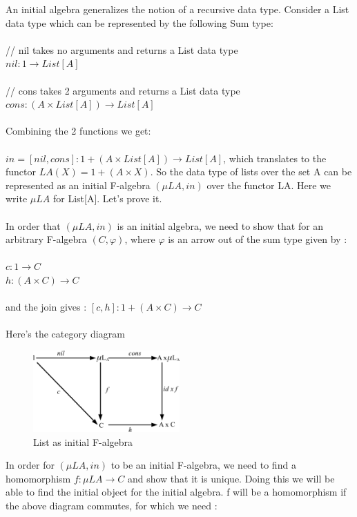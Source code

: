 \documentclass{article}
\begin{document}
An initial algebra generalizes the notion of a recursive data type. Consider a List data type which can be represented by the following Sum type: \\ \\
// nil takes no arguments and returns a List data type \\
$nil: 1 \rightarrow List[A]$ \\ \\
// cons takes 2 arguments and returns a List data type \\
$cons: (A \times List[A]) \rightarrow List[A]$ \\ \\
Combining the 2 functions we get: \\ \\
$in = [nil, cons]: 1 + (A \times List[A]) \rightarrow List[A]$, which translates to the functor $LA(X) = 1 + (A \times X)$. So the data type of lists over the set A can be represented as an initial F-algebra $(\mu LA, in)$ over the functor LA. Here we write $\mu LA$ for List[A]. Let's prove it. \\ \\
In order that $(\mu LA, in)$ is an initial algebra, we need to show that for an arbitrary F-algebra $(C, \varphi)$, where $\varphi$ is an arrow out of the sum type given by : \\ \\
$c: 1 \rightarrow C$ \\
$h: (A \times C) \rightarrow C$ \\ \\
and the join gives :
$[c, h]: 1 + (A \times C) \rightarrow C$ \\ \\
Here's the category diagram
\begin{figure}[htb]
\begin{center}
\includegraphics[width=0.5\textwidth]{figures/alg7}
\caption{List as initial F-algebra}
\end{center}
\end{figure}
In order for $(\mu LA, in)$ to be an initial F-algebra, we need to find a homomorphism $f: \mu LA \rightarrow C$ and show that it is unique. Doing this we will be able to find the initial object for the initial algebra. f will be a homomorphism if the above diagram commutes, for which we need : \\ \\
\end{document}
